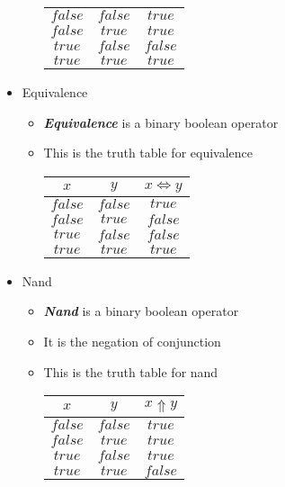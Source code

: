 \documentclass{article}
\begin{document}
\begin{itemize}
\begin{itemize}
\begin{center}
\begin{tabular}{ |c|c|c| }
        \hline
        $false$ & $false$ & $true$ \\
        $false$ & $true$ & $true$ \\
        $true$ & $false$ & $false$ \\
        $true$ & $true$ & $true$ \\
        \hline
      \end{tabular}
    \end{center}
  \end{itemize}
  \item{Equivalence}
  \begin{itemize}
    \item{\textbf{\textit{Equivalence}} is a binary boolean operator}
    \item{This is the truth table for equivalence} \\
    \begin{center}
      \begin{tabular}{ |c|c|c| }
        \hline
        $x$ & $y$ & $x \Leftrightarrow y$ \\
        \hline
        $false$ & $false$ & $true$ \\
        $false$ & $true$ & $false$ \\
        $true$ & $false$ & $false$ \\
        $true$ & $true$ & $true$ \\
        \hline
      \end{tabular}
    \end{center}
  \end{itemize}
  \item{Nand}
  \begin{itemize}
    \item{\textbf{\textit{Nand}} is a binary boolean operator}
    \item{It is the negation of conjunction}
    \item{This is the truth table for nand} \\
    \begin{center}
      \begin{tabular}{ |c|c|c| }
        \hline
        $x$ & $y$ & $x \Uparrow y$ \\
        \hline
        $false$ & $false$ & $true$ \\
        $false$ & $true$ & $true$ \\
        $true$ & $false$ & $true$ \\
        $true$ & $true$ & $false$ \\
        \hline

\end{tabular}
\end{center}
\end{itemize}
\end{itemize}
\end{document}
